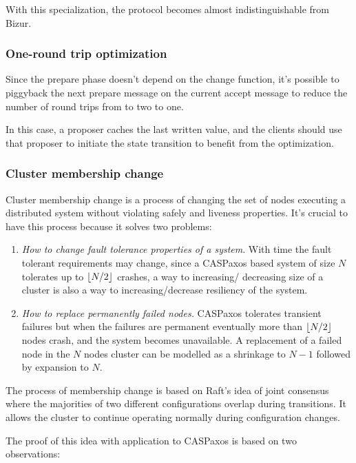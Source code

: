 \documentclass[12pt]{article}
\theoremstyle{definition}
\DeclarePairedDelimiter{\floor}{\lfloor}{\rfloor}
\begin{document}
With this specialization, the protocol becomes almost indistinguishable from Bizur\cite{bizur}.

\subsubsection{One-round trip optimization}

Since the prepare phase doesn't depend on the change function, it's possible to piggyback the next prepare message on the current accept message to reduce the number of round trips from to two to one.

In this case, a proposer caches the last written value, and the clients should use that proposer to initiate the state transition to benefit from the optimization.

\subsubsection{Cluster membership change}

Cluster membership change is a process of changing the set of nodes executing a distributed system without violating safely and liveness properties. It's crucial to have this process because it solves two problems:

\begin{enumerate}
  \item {\it How to change fault tolerance properties of a system}. With time the fault tolerant requirements may change, since a CASPaxos based system of size $N$ tolerates up to $\floor{N/2}$ crashes, a way to increasing/ decreasing size of a cluster is also a way to increasing/decrease resiliency of the system.

  \item {\it How to replace permanently failed nodes.} CASPaxos tolerates transient failures but when the failures are permanent eventually more than $\floor{N/2}$ nodes crash, and the system becomes unavailable. A replacement of a failed node in the $N$ nodes cluster can be modelled as a shrinkage to $N-1$ followed by expansion to $N$.
\end{enumerate}

The process of membership change is based on Raft's idea of joint consensus\cite{raft} where the majorities of two different configurations overlap during transitions. It allows the cluster to continue operating normally during configuration changes.

The proof of this idea with application to CASPaxos is based on two observations:
\end{document}
